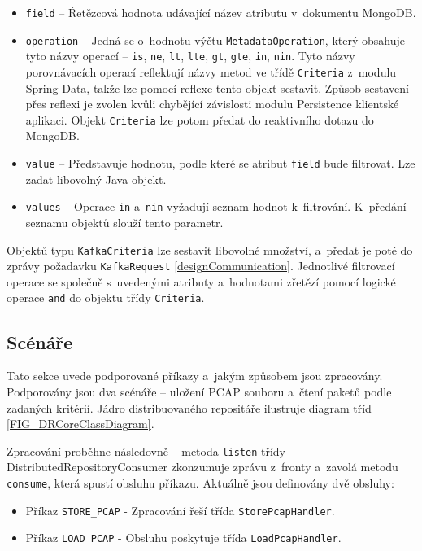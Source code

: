 \begin{itemize}
    \item \texttt{field} -- Řetězcová hodnota udávající název atributu v~dokumentu MongoDB.
    
    \item \texttt{operation} -- Jedná se o~hodnotu výčtu \texttt{MetadataOperation}, který obsahuje tyto názvy operací -- \texttt{is}, \texttt{ne}, \texttt{lt}, \texttt{lte}, \texttt{gt}, \texttt{gte}, \texttt{in}, \texttt{nin}. Tyto názvy porovnávacích operací reflektují názvy metod ve třídě \texttt{Criteria} z~modulu Spring Data, takže lze pomocí reflexe tento objekt sestavit. Způsob sestavení přes reflexi je zvolen kvůli chybějící závislosti modulu Persistence klientské aplikaci.
    Objekt \texttt{Criteria} lze potom předat do reaktivního dotazu do MongoDB.
    
    \item \texttt{value} -- Představuje hodnotu, podle které se atribut \texttt{field} bude filtrovat. Lze zadat libovolný Java objekt.
    
    \item \texttt{values} -- Operace \texttt{in} a~\texttt{nin} vyžadují seznam hodnot k~filtrování. K~předání seznamu objektů slouží tento parametr.
\end{itemize}

\noindent Objektů typu \texttt{KafkaCriteria} lze sestavit libovolné množství, a~předat je poté do zprávy požadavku \texttt{KafkaRequest} \ref{designCommunication}. Jednotlivé filtrovací operace se společně s~uvedenými atributy a~hodnotami zřetězí pomocí logické operace \texttt{and} do objektu třídy \texttt{Criteria}.

\subsection{Scénáře}
Tato sekce uvede podporované příkazy a~jakým způsobem jsou zpracovány. Podporovány jsou dva scénáře -- uložení PCAP souboru a~čtení paketů podle zadaných kritérií. Jádro distribuovaného repositáře ilustruje diagram tříd \ref{FIG_DRCoreClassDiagram}.

Zpracování proběhne následovně -- metoda \texttt{listen} třídy DistributedRepositoryConsumer zkonzumuje zprávu z~fronty a~zavolá metodu \texttt{consume}, která spustí obsluhu příkazu. Aktuálně jsou definovány dvě obsluhy:

\begin{itemize}
    \item Příkaz \texttt{STORE\_PCAP} - Zpracování řeší třída \texttt{StorePcapHandler}.
    \item Příkaz \texttt{LOAD\_PCAP} - Obsluhu poskytuje třída \texttt{LoadPcapHandler}. 
\end{itemize}

